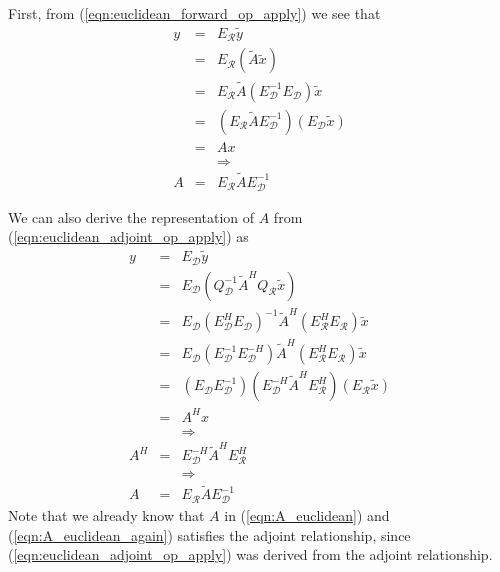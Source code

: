 First, from (\ref{eqn:euclidean_forward_op_apply}) we see that
%
\begin{eqnarray}
y
& = & E_{\mathcal{R}} \tilde{y} \nonumber \\
& = & E_{\mathcal{R}} ( \tilde{A} \tilde{x} ) \nonumber \\
& = & E_{\mathcal{R}} \tilde{A} ( E_{\mathcal{D}}^{-1} E_{\mathcal{D}} ) \tilde{x} \nonumber \\
& = & ( E_{\mathcal{R}} \tilde{A} E_{\mathcal{D}}^{-1} ) ( E_{\mathcal{D}} \tilde{x} ) \nonumber \\
& = & A x \nonumber \\
&  & \Rightarrow \nonumber \\
A & = & E_{\mathcal{R}} \tilde{A} E_{\mathcal{D}}^{-1}
\label{eqn:A_euclidean}
\end{eqnarray}
%

We can also derive the representation of $A$ from
(\ref{eqn:euclidean_adjoint_op_apply}) as
%
\begin{eqnarray}
y
& = & E_{\mathcal{D}} \tilde{y} \nonumber \\
& = & E_{\mathcal{D}} ( Q_{\mathcal{D}}^{-1} \tilde{A}^H Q_{\mathcal{R}} \tilde{x} ) \nonumber \\
& = & E_{\mathcal{D}} ( E_{\mathcal{D}}^H E_{\mathcal{D}} )^{-1} \tilde{A}^H ( E_{\mathcal{R}}^H E_{\mathcal{R}} ) \tilde{x} \nonumber \\
& = & E_{\mathcal{D}} ( E_{\mathcal{D}}^{-1} E_{\mathcal{D}} ^{-H} ) \tilde{A}^H ( E_{\mathcal{R}}^H E_{\mathcal{R}} ) \tilde{x} \nonumber \\
& = & ( E_{\mathcal{D}} E_{\mathcal{D}}^{-1} ) ( E_{\mathcal{D}} ^{-H} \tilde{A}^H E_{\mathcal{R}}^H ) ( E_{\mathcal{R}} \tilde{x} ) \nonumber \\
& = & A^H x \nonumber \\
&  & \Rightarrow \nonumber \\
A^H & = & E_{\mathcal{D}}^{-H} \tilde{A}^H E_{\mathcal{R}}^H  \nonumber \\
\label{eqn:A_euclidean_adjoint} 
&  & \Rightarrow \nonumber \\
A & = & E_{\mathcal{R}} \tilde{A} E_{\mathcal{D}}^{-1}
\label{eqn:A_euclidean_again}
\end{eqnarray}
%
Note that we already know that $A$ in (\ref{eqn:A_euclidean}) and
(\ref{eqn:A_euclidean_again}) satisfies the adjoint relationship, since
(\ref{eqn:euclidean_adjoint_op_apply}) was derived from the adjoint
relationship.

